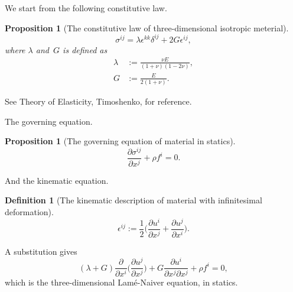 \documentclass{article}
\newtheorem{definition}[lemma]{Definition}
\newtheorem{prop}[lemma]{Proposition}
\begin{document}
We start from the following constitutive law.
\begin{prop}[The constitutive law of three-dimensional isotropic meterial]
  \begin{equation}
    \sigma^{ij} = \lambda \epsilon^{kk} \delta^{ij} + 2G \epsilon^{ij},
  \end{equation}
  where $\lambda$ and~$G$ is defined as
  \begin{equation}\begin{aligned}
    \lambda &\mathrel{:=} \frac{\nu E}{(1 + \nu)(1 - 2\nu)}, \\
    G &\mathrel{:=} \frac{E}{2(1 + \nu)}.
  \end{aligned}\end{equation}
\end{prop}
See Theory of Elasticity, Timoshenko, for reference.

The governing equation.
\begin{prop}[The governing equation of material in statics]
  \begin{equation}
    \frac{\partial \sigma^{ij}}{\partial x^j} + \rho \! f^i = 0.
  \end{equation}
\end{prop}

And the kinematic equation.
\begin{definition}
  [The kinematic description of material with infinitesimal deformation]
  \begin{equation}
    \epsilon^{ij} \mathrel{:=} \frac{1}{2} \biggl(
    \frac{\partial u^i}{\partial x^j} + 
    \frac{\partial u^j}{\partial x^i} \biggr).
  \end{equation}
\end{definition}

A substitution gives
\begin{equation}
  (\lambda + G) \frac{\partial}{\partial x^i}
  \biggl( \frac{\partial u^j}{\partial x^j} \biggr) +
  G \frac{\partial u^i}{\partial x^j \partial x^j} +
  \rho \! f^i = 0,
\end{equation}
which is the three-dimensional Lam\'e-Naiver equation, in statics.
\end{document}

